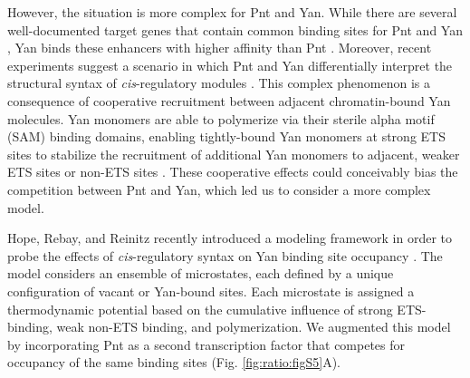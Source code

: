 However, the situation is more complex for Pnt and Yan. While there are several well-documented target genes that contain common binding sites for Pnt and Yan \cite{Halfon2000,Xu2000,Flores2000,BoisclairLachance2018}, Yan binds these enhancers with higher affinity than Pnt \cite{Xu2000}. Moreover, recent experiments suggest a scenario in which Pnt and Yan differentially interpret the structural syntax of \textit{cis}-regulatory modules \cite{BoisclairLachance2018}. This complex phenomenon is a consequence of cooperative recruitment between adjacent chromatin-bound Yan molecules. Yan monomers are able to polymerize via their sterile alpha motif (SAM) binding domains, enabling tightly-bound Yan monomers at strong ETS sites to stabilize the recruitment of additional Yan monomers to adjacent, weaker ETS sites or non-ETS sites \cite{Qiao2004,BoisclairLachance2018}. These cooperative effects could conceivably bias the competition between Pnt and Yan, which led us to consider a more complex model.

Hope, Rebay, and Reinitz recently introduced a modeling framework in order to probe the effects of \textit{cis}-regulatory syntax on Yan binding site occupancy \cite{Hope2017}. The model considers an ensemble of microstates, each defined by a unique configuration of vacant or Yan-bound sites. Each microstate is assigned a thermodynamic potential based on the cumulative influence of strong ETS-binding, weak non-ETS binding, and polymerization. We augmented this model by incorporating Pnt as a second transcription factor that competes for occupancy of the same binding sites (Fig. \ref{fig:ratio:figS5}A). 

